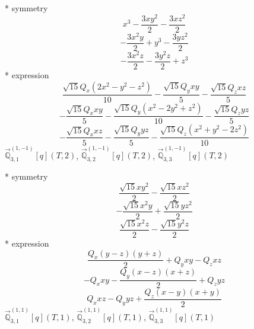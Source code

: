 \documentclass[fleqn,8pt]{jsarticle}
\begin{document}
\noindent\quad ** symmetry
\begin{dmath*}
x^{3} - \frac{3 x y^{2}}{2} - \frac{3 x z^{2}}{2}
\end{dmath*}
\begin{dmath*}
- \frac{3 x^{2} y}{2} + y^{3} - \frac{3 y z^{2}}{2}
\end{dmath*}
\begin{dmath*}
- \frac{3 x^{2} z}{2} - \frac{3 y^{2} z}{2} + z^{3}
\end{dmath*}
\noindent\quad ** expression
\begin{dmath*}
\frac{\sqrt{15} Q_{x} \left(2 x^{2} - y^{2} - z^{2}\right)}{10} - \frac{\sqrt{15} Q_{y} x y}{5} - \frac{\sqrt{15} Q_{z} x z}{5}
\end{dmath*}
\begin{dmath*}
- \frac{\sqrt{15} Q_{x} x y}{5} - \frac{\sqrt{15} Q_{y} \left(x^{2} - 2 y^{2} + z^{2}\right)}{10} - \frac{\sqrt{15} Q_{z} y z}{5}
\end{dmath*}
\begin{dmath*}
- \frac{\sqrt{15} Q_{x} x z}{5} - \frac{\sqrt{15} Q_{y} y z}{5} - \frac{\sqrt{15} Q_{z} \left(x^{2} + y^{2} - 2 z^{2}\right)}{10}
\end{dmath*}
\noindent\quad $\vec{\mathbb{Q}}_{3,1}^{(1,-1)}[q](T,2)$, $\vec{\mathbb{Q}}_{3,2}^{(1,-1)}[q](T,2)$, $\vec{\mathbb{Q}}_{3,3}^{(1,-1)}[q](T,2)$

\noindent\quad ** symmetry
\begin{dmath*}
\frac{\sqrt{15} x y^{2}}{2} - \frac{\sqrt{15} x z^{2}}{2}
\end{dmath*}
\begin{dmath*}
- \frac{\sqrt{15} x^{2} y}{2} + \frac{\sqrt{15} y z^{2}}{2}
\end{dmath*}
\begin{dmath*}
\frac{\sqrt{15} x^{2} z}{2} - \frac{\sqrt{15} y^{2} z}{2}
\end{dmath*}
\noindent\quad ** expression
\begin{dmath*}
\frac{Q_{x} \left(y - z\right) \left(y + z\right)}{2} + Q_{y} x y - Q_{z} x z
\end{dmath*}
\begin{dmath*}
- Q_{x} x y - \frac{Q_{y} \left(x - z\right) \left(x + z\right)}{2} + Q_{z} y z
\end{dmath*}
\begin{dmath*}
Q_{x} x z - Q_{y} y z + \frac{Q_{z} \left(x - y\right) \left(x + y\right)}{2}
\end{dmath*}
\noindent\quad $\vec{\mathbb{Q}}_{3,1}^{(1,1)}[q](T,1)$, $\vec{\mathbb{Q}}_{3,2}^{(1,1)}[q](T,1)$, $\vec{\mathbb{Q}}_{3,3}^{(1,1)}[q](T,1)$
\end{document}
